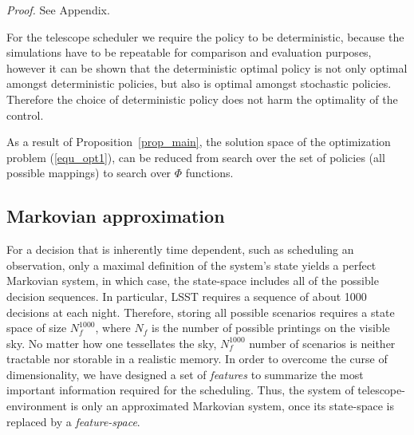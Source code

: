 \documentclass[12pt]{aastex62}
\theoremstyle{definition}
\begin{document}
\textit{Proof.} See Appendix.


For the telescope scheduler we require the policy to be deterministic, because the simulations have to be repeatable for comparison and evaluation purposes, however it can be shown that the deterministic optimal policy is not only optimal amongst deterministic policies, but also is optimal amongst stochastic policies. Therefore the choice of deterministic policy does not harm the optimality of the control. 

As a result of Proposition~\ref{prop_main}, the solution space of the optimization problem (\ref{equ_opt1}), can be reduced from search over the set of policies (all possible mappings) to search over $\Phi$ functions.

\subsection{Markovian approximation}\label{sec_Markov_approx}
For a decision that is inherently time dependent, such as scheduling an observation, only a maximal definition of the system's state yields a perfect Markovian system, in which case, the state-space includes all of the possible decision sequences. In particular, LSST requires a sequence of about 1000 decisions at each night. Therefore, storing all possible scenarios requires a state space of size $N_{f}^{1000}$, where $N_f$ is the number of possible printings on the visible sky. No matter how one tessellates the sky,  $N_{f}^{1000}$ number of scenarios is neither tractable nor storable in a realistic memory. In order to overcome the curse of dimensionality, we have designed a set of   \textit{features} to summarize the most important information required for the scheduling. Thus, the system of telescope-environment is only an approximated Markovian system, once its state-space is replaced by a \textit{feature-space}. 
\end{document}
